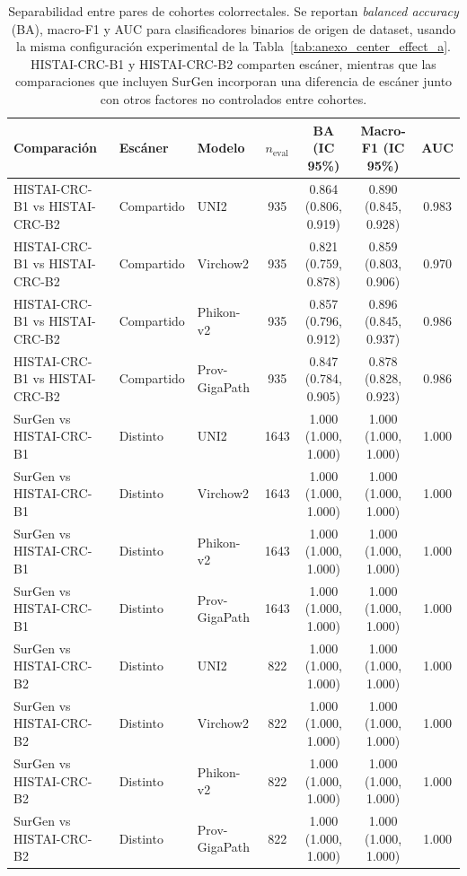 \begin{table}[htbp]
\centering
\caption{Aislamiento del efecto escáner en colorrectal: clasificadores binarios de origen de dataset entre pares de cohortes, misma configuración experimental que la Tabla~\ref{tab:anexo_center_effect_a}. La comparación HISTAI-CRC-B1 vs.\ HISTAI-CRC-B2 comparte escáner, mientras que los pares con SurGen involucran un escáner distinto.}
\label{tab:anexo_center_effect_b}
\small
\begin{tabular}{lllcccc}
\toprule
Comparación & Escáner & Modelo & $n_{\text{eval}}$ & BA (IC 95\%) & Macro-F1 (IC 95\%) & AUC \\
\midrule
HISTAI-CRC-B1 vs HISTAI-CRC-B2 & Compartido & UNI2 & 935 & 0.864 (0.806, 0.919) & 0.890 (0.845, 0.928) & 0.983 \\
HISTAI-CRC-B1 vs HISTAI-CRC-B2 & Compartido & Virchow2 & 935 & 0.821 (0.759, 0.878) & 0.859 (0.803, 0.906) & 0.970 \\
HISTAI-CRC-B1 vs HISTAI-CRC-B2 & Compartido & Phikon-v2 & 935 & 0.857 (0.796, 0.912) & 0.896 (0.845, 0.937) & 0.986 \\
HISTAI-CRC-B1 vs HISTAI-CRC-B2 & Compartido & Prov-GigaPath & 935 & 0.847 (0.784, 0.905) & 0.878 (0.828, 0.923) & 0.986 \\
\midrule
SurGen vs HISTAI-CRC-B1 & Distinto & UNI2 & 1643 & 1.000 (1.000, 1.000) & 1.000 (1.000, 1.000) & 1.000 \\
SurGen vs HISTAI-CRC-B1 & Distinto & Virchow2 & 1643 & 1.000 (1.000, 1.000) & 1.000 (1.000, 1.000) & 1.000 \\
SurGen vs HISTAI-CRC-B1 & Distinto & Phikon-v2 & 1643 & 1.000 (1.000, 1.000) & 1.000 (1.000, 1.000) & 1.000 \\
SurGen vs HISTAI-CRC-B1 & Distinto & Prov-GigaPath & 1643 & 1.000 (1.000, 1.000) & 1.000 (1.000, 1.000) & 1.000 \\
\midrule
SurGen vs HISTAI-CRC-B2 & Distinto & UNI2 & 822 & 1.000 (1.000, 1.000) & 1.000 (1.000, 1.000) & 1.000 \\
SurGen vs HISTAI-CRC-B2 & Distinto & Virchow2 & 822 & 1.000 (1.000, 1.000) & 1.000 (1.000, 1.000) & 1.000 \\
SurGen vs HISTAI-CRC-B2 & Distinto & Phikon-v2 & 822 & 1.000 (1.000, 1.000) & 1.000 (1.000, 1.000) & 1.000 \\
SurGen vs HISTAI-CRC-B2 & Distinto & Prov-GigaPath & 822 & 1.000 (1.000, 1.000) & 1.000 (1.000, 1.000) & 1.000 \\
\bottomrule
\end{tabular}
\caption{Separabilidad entre pares de cohortes colorrectales. Se reportan \textit{balanced accuracy} (BA), macro-F1 y AUC para clasificadores binarios de origen de dataset, usando la misma configuración experimental de la Tabla~\ref{tab:anexo_center_effect_a}. HISTAI-CRC-B1 y HISTAI-CRC-B2 comparten escáner, mientras que las comparaciones que incluyen SurGen incorporan una diferencia de escáner junto con otros factores no controlados entre cohortes.}
\end{table}


